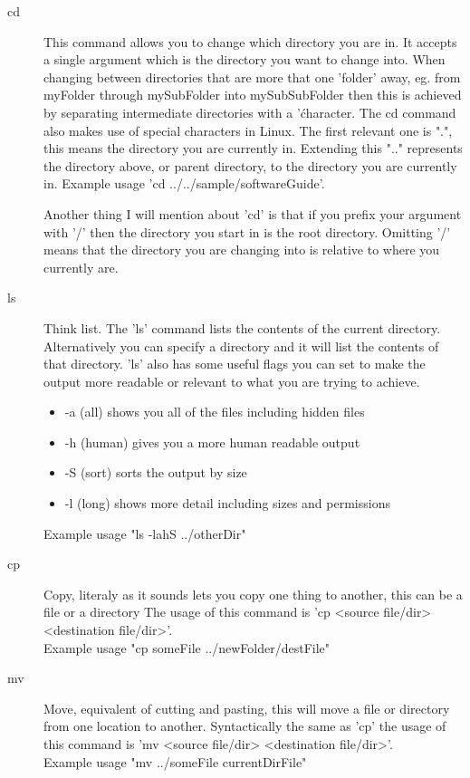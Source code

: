 \documentclass[a4paper,11pt]{report}
\begin{document}
			\begin{description}
				\item[cd]
					This command allows you to change which directory you are in.
					It accepts a single argument which is the directory you want to change into.
					When changing between directories that are more that one 'folder' away, eg. from myFolder through mySubFolder into mySubSubFolder then this is achieved by separating intermediate directories with a '\' character.
					The cd command also makes use of special characters in Linux. The first relevant one is ".", this means the directory you are currently in. Extending this ".." represents the directory above, or parent directory, to the directory you are currently in.
					Example usage 'cd ../../sample/softwareGuide'.

					Another thing I will mention about 'cd' is that if you prefix your argument with '/' then the directory you start in is the root directory. Omitting '/' means that the directory you are changing into is relative to where you currently are.

				\item[ls]
					Think list. The 'ls' command lists the contents of the current directory. Alternatively you can specify a directory and it will list the contents of that directory.
					'ls' also has some useful flags you can set to make the output more readable or relevant to what you are trying to achieve.
					\begin{itemize}
						\item -a (all) shows you all of the files including hidden files
						\item -h (human) gives you a more human readable output
						\item -S (sort) sorts the output by size
						\item -l (long) shows more detail including sizes and permissions
					\end{itemize}
					Example usage "ls -lahS ../otherDir"

				\item[cp]
					Copy, literaly as it sounds lets you copy one thing to another, this can be a file or a directory
					The usage of this command is 'cp <source file/dir> <destination file/dir>'.
					\\Example usage "cp someFile ../newFolder/destFile"

				\item[mv]
					Move, equivalent of cutting and pasting, this will move a file or directory from one location to another.
					Syntactically the same as 'cp' the usage of this command is 'mv <source file/dir> <destination file/dir>'.\\
					Example usage "mv ../someFile currentDirFile"


\end{description}
\end{document}
